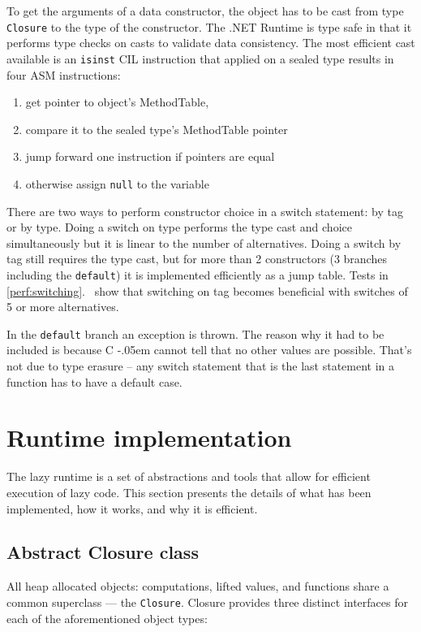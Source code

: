\documentclass[en]{pracamgr}
\newcommand{\shrp}{%
  {\settoheight{\dimen0}{C}\kern-.05em \resizebox{!}{\dimen0}{\raisebox{\depth}{\textbf{\#}}}\hspace{1ex}}}
\newcommand{\myref}[1]{\ref{#1}.~\nameref{#1}}
\begin{document}
To get the arguments of a data constructor, the object has
to be cast from type \texttt{Closure} to the type of the constructor.
The .NET Runtime is type safe in that it performs type
checks on casts to validate data consistency.
The most efficient cast available is an \texttt{isinst} CIL
instruction that applied on a sealed type results in four ASM instructions:

\begin{enumerate}
    \item get pointer to object's MethodTable,
    \item compare it to the sealed type's MethodTable pointer
    \item jump forward one instruction if pointers are equal
    \item otherwise assign \texttt{null} to the variable 
\end{enumerate}

There are two ways to perform constructor choice in a switch statement:
by tag or by type. Doing a switch on type performs the type
cast and choice simultaneously but it is linear to the
number of alternatives. Doing a switch by tag still
requires the type cast, but for more than 2 constructors (3
branches including the \texttt{default}) it is implemented efficiently as a jump table.
Tests in \myref{perf:switching} show that switching on tag
becomes beneficial with switches of 5 or more alternatives.

In the \texttt{default} branch an exception is thrown.
The reason why it had to be included is because C\shrp
cannot tell that no other values are possible.
That's not due to type erasure -- any switch statement that
is the last statement in a function has to have a default case.

\section{Runtime implementation}

The lazy runtime is a set of abstractions and tools
that allow for efficient execution of lazy code.
This section presents the details of what has been implemented,
how it works, and why it is efficient.

\subsection{Abstract Closure class}

All heap allocated objects: computations, lifted values,
and functions share a common superclass –– the \texttt{Closure}.
Closure provides three distinct interfaces for each of the aforementioned object types:
\end{document}
